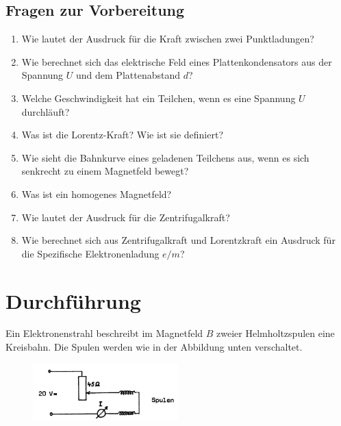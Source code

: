 \begin{tutorhint}
\section{Fragen zur Vorbereitung}

\begin{enumerate}
	\item Wie lautet der Ausdruck für die Kraft zwischen zwei Punktladungen?
	\item Wie berechnet sich das elektrische Feld eines Plattenkondensators aus der Spannung $U$ und dem Plattenabstand $d$?
	\item Welche Geschwindigkeit hat ein Teilchen, wenn es eine Spannung $U$ durchläuft?
	\item Was ist die Lorentz-Kraft? Wie ist sie definiert?
	\item Wie sieht die Bahnkurve eines geladenen Teilchens aus, wenn es sich senkrecht zu einem Magnetfeld bewegt?
	\item Was ist ein homogenes Magnetfeld?
	\item Wie lautet der Ausdruck für die Zentrifugalkraft?
	\item Wie berechnet sich aus Zentrifugalkraft und Lorentzkraft ein Ausdruck für die Spezifische Elektronenladung $e/m$?
\end{enumerate}
\end{tutorhint}

\section{Durchführung} 

Ein Elektronenstrahl beschreibt im Magnetfeld $B$ zweier Helmholtzspulen eine Kreisbahn. Die Spulen werden wie in der Abbildung unten verschaltet.

\begin{figure}[h]
	\centering
		\includegraphics[width=0.50\textwidth]{Abbildungen/Schaltung-HHSpulen.jpg}
	\label{fig:Schaltung-HHSpulen}
\end{figure}

